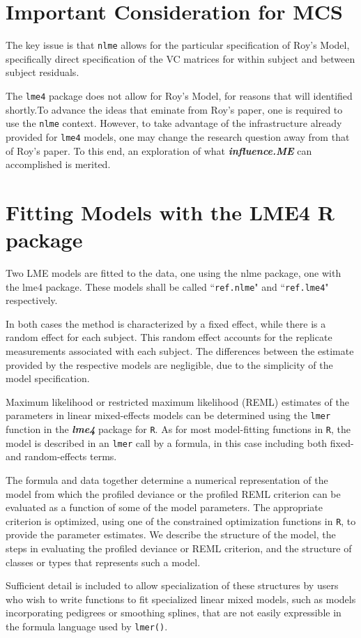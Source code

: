 \documentclass[12pt, a4paper]{report}
\theoremstyle{plain}
\theoremstyle{definition}
\theoremstyle{remark}
\begin{document}
\section{Important Consideration for MCS}

The key issue is that \texttt{nlme} allows for the particular specification of Roy's Model, specifically direct specification of the VC matrices for within subject and between subject residuals.

The \texttt{lme4} package does not allow for Roy's Model, for reasons that will identified shortly.To advance the ideas that eminate from Roy's paper, one is required to use the \texttt{nlme} context. However, to take advantage of the infrastructure already provided for \texttt{lme4} models, one may change the research question away from that of Roy's paper. To this end, an exploration of what \textbf{\textit{influence.ME}} can accomplished is merited. 


\section{Fitting Models with the LME4 R package}
Two LME models are fitted to the data, one using the nlme package, one with the lme4 package. These models shall be called ``\texttt{ref.nlme}" and ``\texttt{ref.lme4}" respectively.

In both cases the method is characterized by a fixed effect, while there is a random effect for each subject. This random effect accounts for the replicate measurements associated with each subject. The differences between the estimate provided by the respective models are negligible, due to the simplicity of the model specification.

Maximum likelihood or restricted maximum likelihood (REML) estimates of the parameters in linear mixed-effects models can be determined using the \texttt{lmer} function in the \textbf{\textit{lme4}} package for \texttt{R}. As for most model-fitting functions in \texttt{R}, the model is described in an \texttt{lmer} call by a formula, in this case including both fixed- and random-effects terms. 

The formula and data together determine a numerical representation of the model from which the profiled deviance or the profiled REML criterion can be evaluated as a function of some of the model parameters. The appropriate criterion is optimized, using one of the constrained optimization functions in \texttt{R}, to provide the parameter estimates. We describe the structure of the model, the steps in evaluating the profiled deviance or REML criterion, and the structure of classes or types that represents such a model. 

Sufficient detail is included to allow specialization of these structures by users who wish to write functions to fit specialized linear mixed models, such as models incorporating pedigrees or smoothing splines, that are not easily expressible in the formula language used by \texttt{lmer()}.





\end{document}
